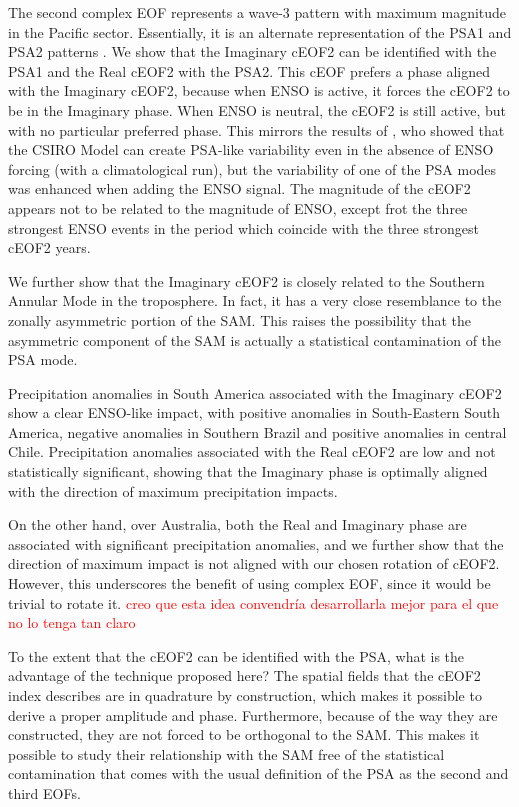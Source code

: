 \documentclass[smallextended]{svjour3}       %
\begin{document}
The second complex EOF represents a wave-3 pattern with maximum magnitude in the Pacific sector.
Essentially, it is an alternate representation of the PSA1 and PSA2 patterns \citep{mo2001}.
We show that the Imaginary cEOF2 can be identified with the PSA1 and the Real cEOF2 with the PSA2.
This cEOF prefers a phase aligned with the Imaginary cEOF2, because when ENSO is active, it forces the cEOF2 to be in the Imaginary phase.
When ENSO is neutral, the cEOF2 is still active, but with no particular preferred phase.
This mirrors the results of \citet{cai2002}, who showed that the CSIRO Model can create PSA-like variability even in the absence of ENSO forcing (with a climatological run), but the variability of one of the PSA modes was enhanced when adding the ENSO signal.
The magnitude of the cEOF2 appears not to be related to the magnitude of ENSO, except frot the three strongest ENSO events in the period which coincide with the three strongest cEOF2 years.

We further show that the Imaginary cEOF2 is closely related to the Southern Annular Mode in the troposphere.
In fact, it has a very close resemblance to the zonally asymmetric portion of the SAM.
This raises the possibility that the asymmetric component of the SAM is actually a statistical contamination of the PSA mode.

Precipitation anomalies in South America associated with the Imaginary cEOF2 show a clear ENSO-like impact, with positive anomalies in South-Eastern South America, negative anomalies in Southern Brazil and positive anomalies in central Chile.
Precipitation anomalies associated with the Real cEOF2 are low and not statistically significant, showing that the Imaginary phase is optimally aligned with the direction of maximum precipitation impacts.

On the other hand, over Australia, both the Real and Imaginary phase are associated with significant precipitation anomalies, and we further show that the direction of maximum impact is not aligned with our chosen rotation of cEOF2.
However, this underscores the benefit of using complex EOF, since it would be trivial to rotate it.
\textcolor{red}{creo que esta idea convendría desarrollarla mejor para el que no lo tenga tan claro}

To the extent that the cEOF2 can be identified with the PSA, what is the advantage of the technique proposed here?
The spatial fields that the cEOF2 index describes are in quadrature by construction, which makes it possible to derive a proper amplitude and phase.
Furthermore, because of the way they are constructed, they are not forced to be orthogonal to the SAM.
This makes it possible to study their relationship with the SAM free of the statistical contamination that comes with the usual definition of the PSA as the second and third EOFs.
\end{document}

